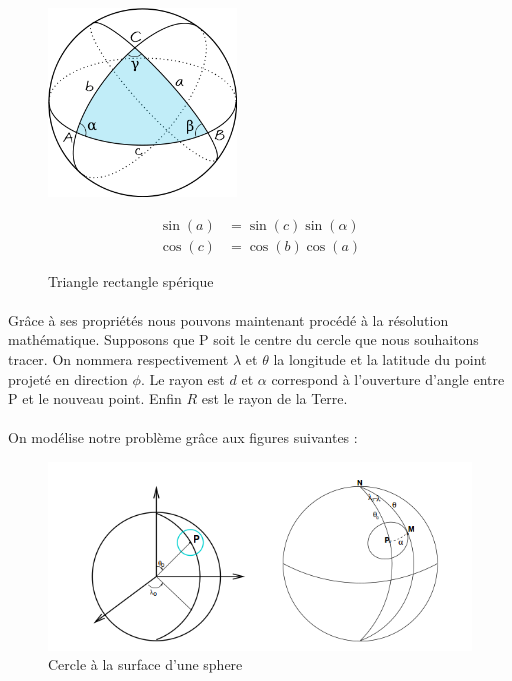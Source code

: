 \documentclass[a4paper]{report}
\begin{document}
\begin{figure}[H]
	\begin{minipage}[c]{.46\linewidth}
		\begin{center}
			\includegraphics[width=5cm]{image/sprint2_triangles_spheriques}
       			\caption{Triangle rectangle spérique}
			\label{Triangle rectangle spérique}
		\end{center}
	\end{minipage} \hfill
	\begin{minipage}[c]{.46\linewidth}
		\begin{align}
			\sin(a)&=\sin(c)\sin(\alpha) \\
			\cos(c)&=\cos(b)\cos(a) 
		\end{align}
	\end{minipage}
\end{figure}

\paragraph{} Grâce à ses propriétés nous pouvons maintenant procédé à la résolution mathématique. Supposons que P soit le centre du cercle que nous souhaitons tracer. On nommera respectivement $\lambda$ et $\theta$ la longitude et la latitude du point projeté en direction $\phi$. Le rayon est $d$ et $\alpha$ correspond à l'ouverture d'angle entre P et le nouveau point. Enfin $R$ est le rayon de la Terre.

\paragraph{} On modélise notre problème grâce aux figures suivantes :

\begin{figure}[H]
	\begin{center}
		\includegraphics[width=400pt]{image/sprint2_petits-cercles}
		\caption{Cercle à la surface d'une sphere}
		\label{Cercle à la surface d'une sphere}
	\end{center}
\end{figure}
\end{document}
